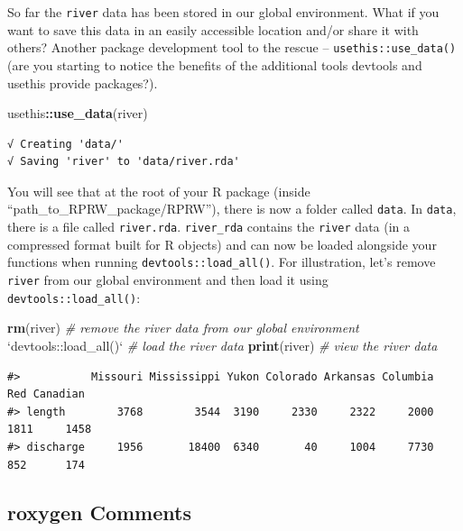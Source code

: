 \documentclass[
]{book}
\newenvironment{Shaded}{\begin{snugshade}}{\end{snugshade}}
\newcommand{\CommentTok}[1]{\textcolor[rgb]{0.56,0.35,0.01}{\textit{#1}}}
\newcommand{\DataTypeTok}[1]{\textcolor[rgb]{0.13,0.29,0.53}{#1}}
\newcommand{\KeywordTok}[1]{\textcolor[rgb]{0.13,0.29,0.53}{\textbf{#1}}}
\newcommand{\NormalTok}[1]{#1}
\newcommand{\OperatorTok}[1]{\textcolor[rgb]{0.81,0.36,0.00}{\textbf{#1}}}
\newcommand{\StringTok}[1]{\textcolor[rgb]{0.31,0.60,0.02}{#1}}
\begin{document}
So far the \texttt{river} data has been stored in our global environment. What if you want to save this data in an easily accessible location and/or share it with others? Another package development tool to the rescue -- \texttt{usethis::use\_data()} (are you starting to notice the benefits of the additional tools devtools and usethis provide packages?).

\begin{Shaded}
\begin{Highlighting}[]
\NormalTok{usethis}\OperatorTok{::}\KeywordTok{use_data}\NormalTok{(river)}
\end{Highlighting}
\end{Shaded}

\begin{verbatim}
√ Creating 'data/'
√ Saving 'river' to 'data/river.rda'
\end{verbatim}

You will see that at the root of your R package (inside ``path\_to\_RPRW\_package/RPRW''), there is now a folder called \texttt{data}. In \texttt{data}, there is a file called \texttt{river.rda}. \texttt{river\_rda} contains the \texttt{river} data (in a compressed format built for R objects) and can now be loaded alongside your functions when running \texttt{devtools::load\_all()}. For illustration, let's remove \texttt{river} from our global environment and then load it using \texttt{devtools::load\_all()}:

\begin{Shaded}
\begin{Highlighting}[]
\KeywordTok{rm}\NormalTok{(river) }\CommentTok{# remove the river data from our global environment}
\StringTok{`}\DataTypeTok{devtools::load_all()}\StringTok{`} \CommentTok{# load the river data}
\KeywordTok{print}\NormalTok{(river) }\CommentTok{# view the river data}
\end{Highlighting}
\end{Shaded}

\begin{verbatim}
#>           Missouri Mississippi Yukon Colorado Arkansas Columbia  Red Canadian
#> length        3768        3544  3190     2330     2322     2000 1811     1458
#> discharge     1956       18400  6340       40     1004     7730  852      174
\end{verbatim}

\hypertarget{roxygen}{%
\subsection{roxygen Comments}\label{roxygen}}
\end{document}
